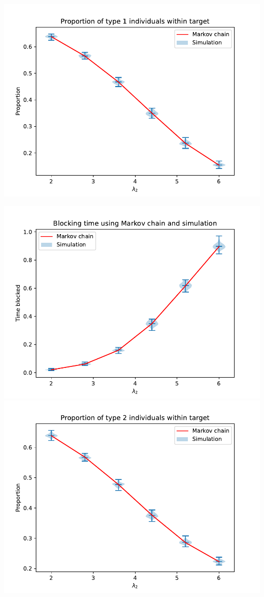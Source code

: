 \begin{frame}
\begin{multicols}{3}
        \includegraphics[scale=0.2]{Bin/performance_measures_comparison/proportion_1_comparison.pdf}
        
        \columnbreak
        \centering
        \includegraphics[scale=0.2]{Bin/performance_measures_comparison/blocking_comparison.pdf}
        \includegraphics[scale=0.2]{Bin/performance_measures_comparison/proportion_2_comparison.pdf}
    \end{multicols}


\end{frame}
